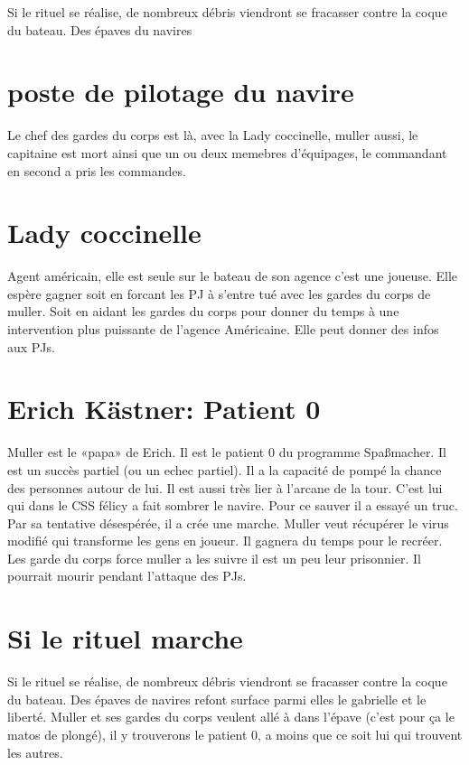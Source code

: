\documentclass[oneside,12pt]{book}
\begin{document}
\begin{flushleft}
Si le rituel se réalise, de nombreux débris viendront se fracasser contre la coque du bateau.
Des épaves du navires 

\section{ poste de pilotage du navire}
Le chef des gardes du corps est là, avec la Lady coccinelle, muller aussi, le capitaine est mort ainsi que un ou deux memebres d'équipages, le commandant en second 
a pris les commandes.

\section{ Lady coccinelle }
Agent américain, elle est seule sur le bateau de son agence c'est une joueuse. Elle espère gagner soit en forcant les PJ à s'entre tué avec les gardes du corps de muller. Soit en aidant les gardes du corps pour donner du temps à une intervention plus puissante de l'agence Américaine. Elle peut donner des infos aux PJs. 

\section{Erich Kästner: Patient 0}
Muller est le «papa» de Erich. Il est le patient 0 du programme Spaßmacher. Il est un succès partiel (ou un echec partiel).
Il a la capacité de pompé la chance des personnes autour de lui. Il est aussi très lier à l'arcane de la tour.
C'est lui qui dans le CSS félicy a fait sombrer le navire. Pour ce sauver il a essayé un truc. 
Par sa tentative désespérée, il a crée une marche. Muller veut récupérer le virus modifié qui transforme les gens en joueur. Il gagnera du temps pour le recréer.  
Les garde du corps force muller a les suivre il est un peu leur prisonnier. Il  pourrait mourir pendant l'attaque des PJs. 

\section{Si le rituel marche}
Si le rituel se réalise, de nombreux débris viendront se fracasser contre la coque du bateau.
Des épaves de navires refont surface parmi elles le gabrielle et le liberté. 
Muller et ses gardes du corps veulent allé à dans l'épave (c'est pour ça le matos de plongé), il y trouverons le patient 0, a moins que ce soit lui qui trouvent les autres.
 

\end{flushleft}
\end{document}
